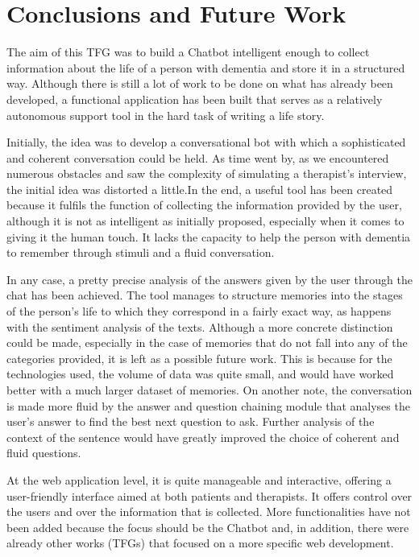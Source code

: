 \chapter{Conclusions and Future Work}
\label{cap:conclusions}

The aim of this TFG was to build a Chatbot intelligent enough to collect information about the life of a person with dementia and store it in a structured way. Although there is still a lot of work to be done on what has already been developed, a functional application has been built that serves as a relatively autonomous support tool in the hard task of writing a life story.

Initially, the idea was to develop a conversational bot with which a sophisticated and coherent conversation could be held. As time went by, as we encountered numerous obstacles and saw the complexity of simulating a therapist's interview, the initial idea was distorted a little.In the end, a useful tool has been created because it fulfils the function of collecting the information provided by the user, although it is not as intelligent as initially proposed, especially when it comes to giving it the human touch. It lacks the capacity to help the person with dementia to remember through stimuli and a fluid conversation.

In any case, a pretty precise analysis of the answers given by the user through the chat has been achieved. The tool manages to structure memories into the stages of the person's life to which they correspond in a fairly exact way, as happens with the sentiment analysis of the texts. Although a more concrete distinction could be made, especially in the case of memories that do not fall into any of the categories provided, it is left as a possible future work. This is because for the technologies used, the volume of data was quite small, and would have worked better with a much larger dataset of memories. On another note, the conversation is made more fluid by the answer and question chaining module that analyses the user's answer to find the best next question to ask. Further analysis of the context of the sentence would have greatly improved the choice of coherent and fluid questions.

At the web application level, it is quite manageable and interactive, offering a user-friendly interface aimed at both patients and therapists. It offers control over the users and over the information that is collected. More functionalities have not been added because the focus should be the Chatbot and, in addition, there were already other works (TFGs) that focused on a more specific web development.

